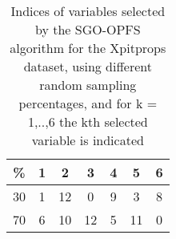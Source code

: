 \begin{table}
	\begin{center}
		\begin{tabular}{c c c c c c c}
			\% & 1 & 2 & 3 & 4 & 5 & 6 \\
			\hline
			30 & 1 & 12 & 0 & 9 & 3 & 8 \\
			70 & 6 & 10 & 12 & 5 & 11 & 0 \\
		\end{tabular}
	\end{center}
	\caption{Indices of variables selected by the SGO-OPFS algorithm for the Xpitprops dataset, using different random sampling percentages, and for k = 1,..,6 the kth selected variable is indicated}
\end{table}